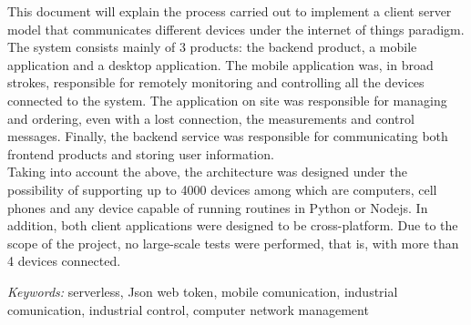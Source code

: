 This document will explain the process carried out to implement a client server model that communicates different devices under the internet of things paradigm. The system consists mainly of 3 products: the backend product, a mobile application and a desktop application. The mobile application was, in broad strokes, responsible for remotely monitoring and controlling all the devices connected to the system. The application on site was responsible for managing and ordering, even with a lost connection, the measurements and control messages. Finally, the backend service was responsible for communicating both frontend products and storing user information.
\vspace {0.5cm} \\
Taking into account the above, the architecture was designed under the possibility of supporting up to 4000 devices among which are computers, cell phones and any device capable of running routines in Python or Nodejs. In addition, both client applications were designed to be cross-platform. Due to the scope of the project, no large-scale tests were performed, that is, with more than 4 devices connected.

\begin{center}
\textsl{Keywords:} serverless, Json web token, mobile comunication, industrial comunication, industrial control, computer network management
\end{center}